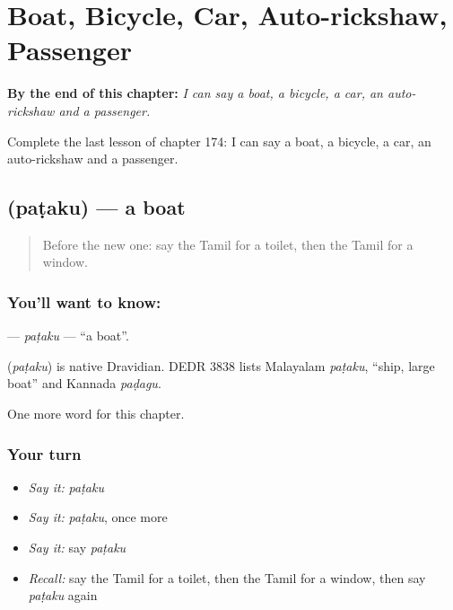 
\chapter{Boat, Bicycle, Car, Auto-rickshaw, Passenger}
\label{ch:ta-boat-bicycle-car-auto-rickshaw-passenger}

\begin{chapteropening}
\textbf{By the end of this chapter:} \emph{I can say a boat, a bicycle, a car, an auto-rickshaw and a passenger.}

Complete the last lesson of chapter 174: I can say a boat, a bicycle, a car, an auto-rickshaw and a passenger.
\end{chapteropening}

\section[\texorpdfstring{\ta{படகு} (paṭaku)}{படகு (paṭaku)}]{ (paṭaku) — a boat}

\label{lesson:TA-C174-pataku}



\begin{quote}
Before the new one: say the Tamil for a toilet, then the Tamil for a window.
\end{quote}

\subsection*{You'll want to know: }
\textbf{} — \emph{paṭaku} — \textquotedblleft{}a boat\textquotedblright{}.

\begin{cousinweb}
\textbf{} (\emph{paṭaku}) is native Dravidian. DEDR 3838 lists Malayalam \emph{paṭaku}, \textquotedblleft{}ship, large boat\textquotedblright{} and Kannada \emph{paḍagu}.
\end{cousinweb}

\begin{grammarlens}[title={What you've built}]
One more word for this chapter.
\end{grammarlens}

\subsection*{Your turn}
\begin{itemize}
\raggedright
  \item \emph{Say it:} \emph{paṭaku}
  \item \emph{Say it:} \emph{paṭaku}, once more
  \item \emph{Say it:} say \emph{paṭaku}
  \item \emph{Recall:} say the Tamil for a toilet, then the Tamil for a window, then say \emph{paṭaku} again
\end{itemize}

